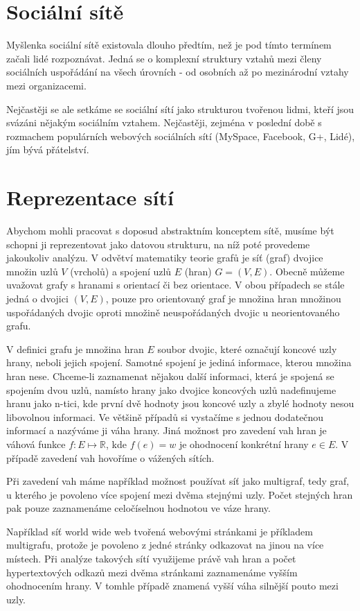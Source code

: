 \documentclass[12pt,titlepage]{report}
\begin{document}
\section{Sociální sítě}
Myšlenka sociální sítě existovala dlouho předtím, než je pod tímto termínem
začali lidé rozpoznávat. Jedná se o komplexní struktury vztahů mezi členy
sociálních uspořádání na všech úrovních - od osobních až po mezinárodní vztahy
mezi organizacemi.

Nejčastěji se ale setkáme se sociální sítí jako strukturou tvořenou lidmi,
kteří jsou svázáni nějakým sociálním vztahem.  Nejčastěji, zejména v poslední
době s rozmachem populárních webových sociálních sítí (MySpace, Facebook, G+,
Lidé), jím bývá přátelství.

\section{Reprezentace sítí}
Abychom mohli pracovat s doposud abstraktním konceptem sítě, musíme být schopni
ji reprezentovat jako datovou strukturu, na níž poté provedeme jakoukoliv
analýzu.
V odvětví matematiky teorie grafů je síť (graf) dvojice množin uzlů $V$
(vrcholů) a spojení uzlů $E$ (hran) $G = (V, E)$.  Obecně můžeme uvažovat grafy
s hranami s orientací či bez orientace. V obou případech se stále jedná o
dvojici $(V, E)$, pouze pro orientovaný graf je množina hran množinou
uspořádaných dvojic oproti množině neuspořádaných dvojic u neorientovaného
grafu.

V definici grafu je množina hran $E$ soubor dvojic, které označují koncové uzly
hrany, neboli jejich spojení. Samotné spojení je jediná informace, kterou
množina hran nese. Chceme-li zaznamenat nějakou další informaci, která je
spojená se spojením dvou uzlů, namísto hrany jako dvojice koncových uzlů
nadefinujeme hranu jako n-tici, kde první dvě hodnoty jsou koncové uzly a zbylé
hodnoty nesou libovolnou informaci. Ve většině případů si vystačíme s jednou
dodatečnou informací a nazýváme ji váha hrany. Jiná možnost pro zavedení vah
hran je váhová funkce $f: E \mapsto \mathbb{R}$, kde $f(e) = w$ je ohodnocení
konkrétní hrany $e \in E$. V případě zavedení vah hovoříme o vážených sítích.

Při zavedení vah máme například možnost používat síť jako multigraf, tedy graf,
u kterého je povoleno více spojení mezi dvěma stejnými uzly. Počet stejných
hran pak pouze zaznamenáme celočíselnou hodnotou ve váze hrany.

Například síť world wide web tvořená webovými stránkami je příkladem
multigrafu, protože je povoleno z jedné stránky odkazovat na jinou na více
místech. Při analýze takových sítí využijeme právě vah hran a počet
hypertextových odkazů mezi dvěma stránkami zaznamenáme vyšším ohodnocením
hrany. V tomhle případě znamená vyšší váha silnější pouto mezi uzly.
\end{document}
